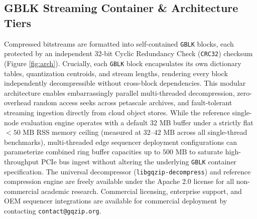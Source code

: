 \documentclass[10pt,twocolumn,a4paper]{article}
\begin{document}
\subsection{GBLK Streaming Container \& Architecture Tiers}
Compressed bitstreams are formatted into self-contained \texttt{GBLK} blocks, each protected by an independent 32-bit Cyclic Redundancy Check (\texttt{CRC32}) checksum (Figure \ref{fig:arch}). Crucially, each \texttt{GBLK} block encapsulates its own dictionary tables, quantization centroids, and stream lengths, rendering every block independently decompressible without cross-block dependencies. This modular architecture enables embarrassingly parallel multi-threaded decompression, zero-overhead random access seeks across petascale archives, and fault-tolerant streaming ingestion directly from cloud object stores. While the reference single-node evaluation engine operates with a default 32 MB buffer under a strictly flat $<50\text{ MB}$ RSS memory ceiling (measured at $32\text{--}42\text{ MB}$ across all single-thread benchmarks), multi-threaded edge sequencer deployment configurations can parameterize combined ring buffer capacities up to $500\text{ MB}$ to saturate high-throughput PCIe bus ingest without altering the underlying \texttt{GBLK} container specification. The universal decompressor (\texttt{libgqzip-decompress}) and reference compression engine are freely available under the Apache 2.0 license for all non-commercial academic research. Commercial licensing, enterprise support, and OEM sequencer integrations are available for commercial deployment by contacting \texttt{contact@gqzip.org}.
\end{document}

